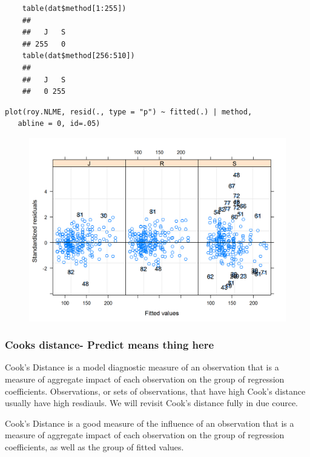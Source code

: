 \begin{framed}
	\begin{verbatim}
	table(dat$method[1:255])
	## 
	##   J   S 
	## 255   0
	table(dat$method[256:510])
	## 
	##   J   S 
	##   0 255
	\end{verbatim}	
\end{framed}
\newpage
\begin{framed}
\begin{verbatim}
plot(roy.NLME, resid(., type = "p") ~ fitted(.) | method, 
   abline = 0, id=.05)
\end{verbatim}
\end{framed}
\begin{figure}
\centering
\includegraphics[width=0.9\linewidth]{images/bloodnlmeResidPlot2}
\caption{}
\label{fig:blood}
\end{figure}


\subsubsection{Cooks distance- Predict means thing here}
Cook's Distance is a model diagnostic measure of an observation that is a measure of aggregate impact of each observation on the group of regression coefficients. Observations, or sets of observations, that have high Cook's distance usually have high resdiauls. We will revisit Cook's distance fully in due cource.

Cook's Distance is a good measure of the influence of an observation that is a measure of aggregate impact of each observation on the group of regression coefficients, as well as the group of fitted values.


